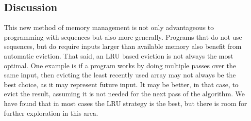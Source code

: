 \subsection{Discussion}

This new method of memory management is not only advantageous to programming with sequences but also more generally. Programs that do not use sequences, but do require inputs larger than available memory also benefit from automatic eviction. That said, an LRU based eviction is not always the most optimal. One example is if a program works by doing multiple passes over the same input, then evicting the least recently used array may not always be the best choice, as it may represent future input. It may be better, in that case, to evict the result, assuming it is not needed for the next pass of the algorithm. We have found that in most cases the LRU strategy is the best, but there is room for further exploration in this area.